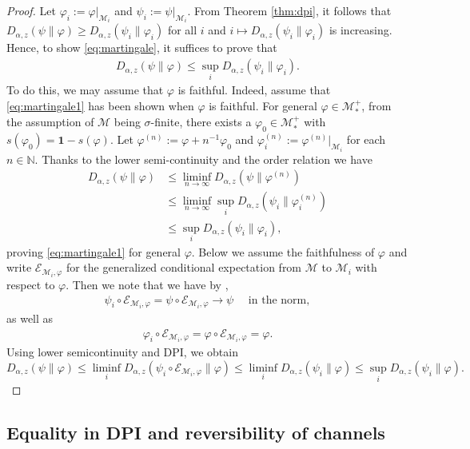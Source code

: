 \documentclass[12pt]{article}
\theoremstyle{definition}
\theoremstyle{remark}
\numberwithin{equation}{section}
\def\cE{\mathcal E}
\def\cM{\mathcal M}
\def\ffi{\varphi}
\def\1{\mathbf{1}}
\def\bN{\mathbb{N}}
\begin{document}
\begin{proof}
Let $\ffi_i:=\ffi|_{\cM_i}$ and $\psi_i:=\psi|_{\cM_i}$. From Theorem
\ref{thm:dpi}, it
follows that $D_{\alpha,z}(\psi\|\ffi)\ge D_{\alpha,z}(\psi_i\|\ffi_i)$ for all $i$ and
$i\mapsto D_{\alpha,z}(\psi_i\|\ffi_i)$ is increasing. Hence, to show \eqref{eq:martingale}, it suffices to prove that
\begin{align}\label{eq:martingale1}
D_{\alpha,z}(\psi\|\ffi)\le\sup_iD_{\alpha,z}(\psi_i\|\ffi_i).
\end{align}
To do this, we may assume that $\ffi$ is faithful. Indeed, assume that
\eqref{eq:martingale1} has been shown when $\ffi$ is
faithful. For general $\ffi\in\cM_*^+$, from the assumption of $\cM$ being $\sigma$-finite, there exists a
$\ffi_0\in\cM_*^+$ with $s(\ffi_0)=\1-s(\ffi)$. Let $\ffi^{(n)}:=\ffi+n^{-1}\ffi_0$ and $\ffi_i^{(n)}:=\ffi^{(n)}|_{\cM_i}$
for each $n\in\bN$. Thanks to the lower semi-continuity \cite[Theorem 1(iv) and Theorem
2(iv)]{kato2023onrenyi} and the order
relation \cite[Theorem 1(iii) and Theorem 2(iii)]{kato2023onrenyi} we have
\begin{align*}
D_{\alpha,z}(\psi\|\ffi)&\le\liminf_{n\to\infty}D_{\alpha,z}(\psi\|\ffi^{(n)}) \\
&\le\liminf_{n\to\infty}\sup_iD_{\alpha,z}(\psi_i\|\ffi_i^{(n)}) \\
&\le\sup_iD_{\alpha,z}(\psi_i\|\ffi_i),
\end{align*}
proving \eqref{eq:martingale1} for general $\ffi$. Below we assume the faithfulness of $\ffi$ and write $\cE_{\cM_i,\ffi}$
for the generalized conditional expectation from $\cM$ to $\cM_i$ with respect to $\ffi$. 
Then we note that we have by \cite[Theorem 3]{hiai1984strong},  
\begin{align}\label{eq:martingaleHT}
\psi_i\circ\cE_{\cM_i,\ffi}=\psi\circ\cE_{\cM_i,\ffi}\to\psi\quad\mbox{ in the norm},
\end{align}
as well as
\begin{align}\label{eq:condexp}
\ffi_i\circ\cE_{\cM_i,\ffi}=\ffi\circ\cE_{\cM_i,\ffi}=\ffi.
\end{align}
Using lower semicontinuity and DPI, we obtain
\[
D_{\alpha,z}(\psi\|\ffi)\le \liminf_{i}
D_{\alpha,z}(\psi_i\circ\cE_{\cM_i,\varphi}\|\ffi)\le \liminf_i
D_{\alpha,z}(\psi_i\|\varphi)\le \sup_i D_{\alpha,z}(\psi_i\|\ffi).
\]
\end{proof}


\subsection{Equality in DPI and reversibility of channels}
\end{document}
